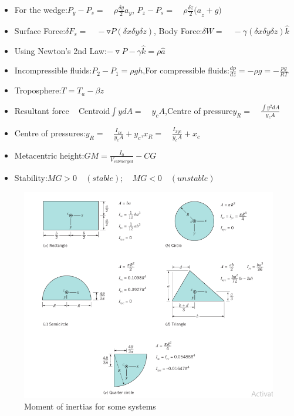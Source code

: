 \documentclass[10pt]{article}
\begin{document}
\begin{itemize}
\item For the wedge:\quad ${ P }_{ y }-{ P }_{ s }=\quad \rho \frac { \delta y }{ 2 } { a }_{ y }$, \quad ${ P }_{ z }-{ P }_{ s }=\quad \rho \frac { \delta z }{ 2 } { (a }_{ z }+g)$
\item Surface Force:\quad$\delta { F }_{ s }=\quad -\triangledown P(\delta x\delta y\delta z)$, \quad Body Force:\quad$\delta W=\quad -\gamma (\delta x\delta y\delta z)\hat { k } $
\item Using Newton's 2nd Law:\quad$-\triangledown P- \gamma \hat { k } = \rho \hat { a } $
\item Incompressible fluids:\quad${ P }_{ 2 }-{ P }_{ 1 }=\rho gh$,\quad For compressible fluids:\quad$\frac { dp }{ dz } = -\rho g = -\frac { pg }{ RT } $
\item Troposphere:\quad$T={ T }_{ a }-\beta z$
\item Resultant force ~ Centroid\quad$\int { ydA=\quad { y }_{ c }A } $,\quad Centre of pressure\quad${ y }_{ R }=\quad \frac { \int { { y }^{ 2 }dA }  }{ { y }_{ c }A } $
\item Centre of pressures:\quad${ y }_{ R }=\quad \frac { { I }_{ xc } }{ { y }_{ c }A } +{ y }_{ c }$,\quad${ x }_{ R }=\quad \frac { { I }_{ xyc } }{ { y }_{ c }A } +{ x }_{ c }$
\item Metacentric height:\quad$GM=\frac { { I }_{ 0 } }{ { V }_{ submerged } } -CG$
\item Stability:\quad$MG>0\quad (stable);\quad MG<0\quad (unstable)$
\end{itemize}
\begin{figure}[ht!]
\centering
\includegraphics{Capture.png}
\caption{Moment of inertias for some systems}
\label{overflow}
\end{figure}
\end{document}
